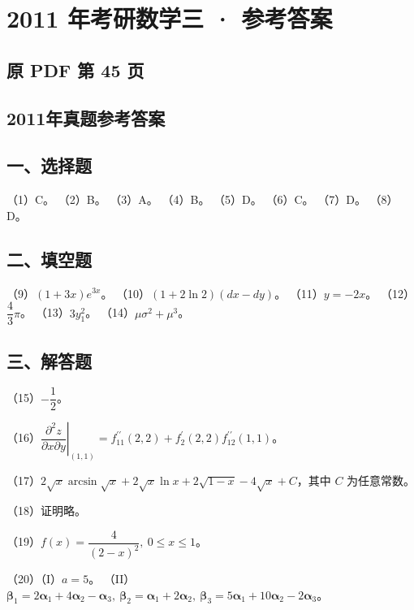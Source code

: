 \documentclass[UTF8,12pt]{ctexart}
\begin{document}
\section*{2011 年考研数学三 · 参考答案}
\subsection*{原 PDF 第 45 页}

\subsection*{2011年真题参考答案}

\subsection*{一、选择题}

（1）C。 （2）B。 （3）A。 （4）B。 （5）D。 （6）C。 （7）D。 （8）D。


\subsection*{二、填空题}

（9）\(\displaystyle (1+3x)e^{3x}\)。 （10）\(\displaystyle (1+2\ln2)(dx-dy)\)。 （11）\(\displaystyle y=-2x\)。 （12）\(\displaystyle \dfrac{\displaystyle 4}{\displaystyle 3}\pi\)。 （13）\(\displaystyle 3y_1^2\)。 （14）\(\displaystyle \mu\sigma^2+\mu^3\)。


\subsection*{三、解答题}

（15）\(\displaystyle -\dfrac{\displaystyle 1}{\displaystyle 2}\)。


（16）\(\displaystyle \left.\dfrac{\displaystyle \partial^2z}{\displaystyle \partial x\partial y}\right|_{(1,\allowbreak 1)}=f^{\prime\prime}_{11}(2,\allowbreak 2)+f^{\prime}_2(2,\allowbreak 2)f^{\prime\prime}_{12}(1,\allowbreak 1)\)。


（17）\(\displaystyle 2\sqrt{x}\arcsin\sqrt{x}+2\sqrt{x}\ln x+2\sqrt{1-x}-4\sqrt{x}+C\)，其中 \(\displaystyle C\) 为任意常数。


（18）证明略。


（19）\(\displaystyle f(x)=\dfrac{\displaystyle 4}{\displaystyle (2-x)^2},\allowbreak \ 0\le x\le1\)。


（20）（I）\(\displaystyle a=5\)。
（II）\(\displaystyle \boldsymbol\beta_1=2\boldsymbol\alpha_1+4\boldsymbol\alpha_2-\boldsymbol\alpha_3,\allowbreak \ \boldsymbol\beta_2=\boldsymbol\alpha_1+2\boldsymbol\alpha_2,\allowbreak \ \boldsymbol\beta_3=5\boldsymbol\alpha_1+10\boldsymbol\alpha_2-2\boldsymbol\alpha_3\)。
\end{document}
